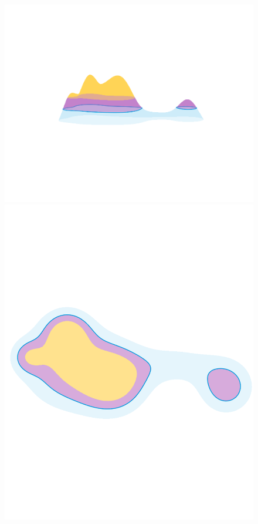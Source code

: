 \begin{figure}[htbp]\label{fig:assumption_2}
  \centering
  \includegraphics[trim=200 325 150 300, clip, scale=0.3]{scripts/figures/scalar_a2_B.png}
  \includegraphics[trim=0 350 0 370, clip, scale=0.2]{scripts/figures/scalar_a2_B_top.png}

\end{figure}
